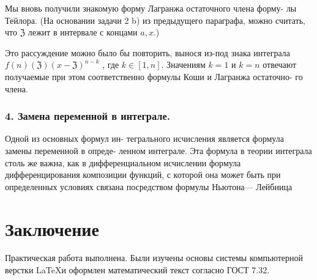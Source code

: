 Мы вновь получили знакомую форму Лагранжа остаточного члена форму-
лы Тейлора. (На основании задачи 2 b) из предыдущего параграфа, можно
считать, что $\mathfrak{Z}$ лежит в интервале с концами $a, x$.)

Это рассуждение можно было бы повторить, вынося из-под знака интеграла $f (n)(\mathfrak{Z})(x - \mathfrak{Z})^{n-k}$ , где $k \in [1, n]$. Значениям $k = 1$ и $k = n$ отвечают
получаемые при этом соответственно формулы Коши и Лагранжа остаточно-
го члена.

\subsubsection{4. Замена переменной в интеграле.} Одной из основных формул ин-
тегрального исчисления является формула замены переменной в опреде-
ленном интеграле. Эта формула в теории интеграла столь же важна, как в
дифференциальном исчислении формула дифференцирования композиции
функций, с которой она может быть при определенных условиях связана
посредством формулы Ньютона— Лейбница

\cite{book}

\newpage
\section*{Заключение}
Практическая работа выполнена. Были изучены основы системы компьютерной верстки \LaTeX и оформлен математический текст согласно ГОСТ 7.32. 